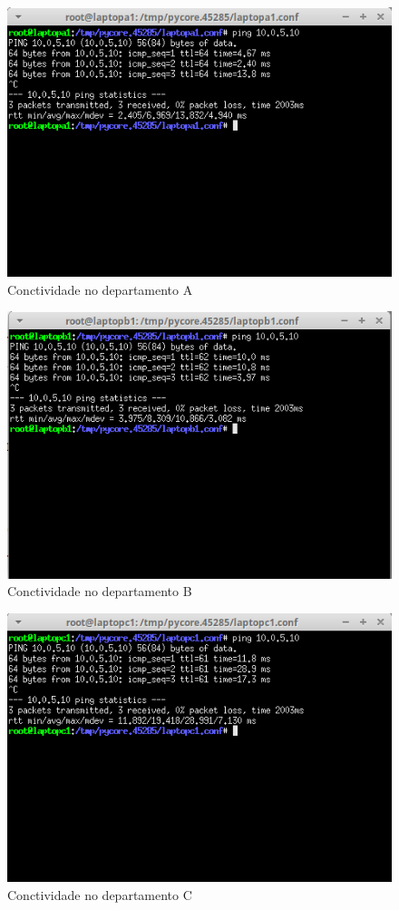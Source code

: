 \documentclass{article}
\begin{document}
\begin{figure}[h]
	\centering
	\includegraphics[scale = 0.6]{conectividade-redea-ex1.png}
	\caption{Conctividade no departamento A}
\end{figure}

\begin{figure}[h]
	\centering
	\includegraphics[scale = 0.6]{conectividade-redeb-ex1.png}
	\caption{Conctividade no departamento B}
\end{figure}

\begin{figure}[h]
	\centering
	\includegraphics[scale = 0.6]{conectividade-redec-ex1.png}
	\caption{Conctividade no departamento C}
\end{figure}
\end{document}
